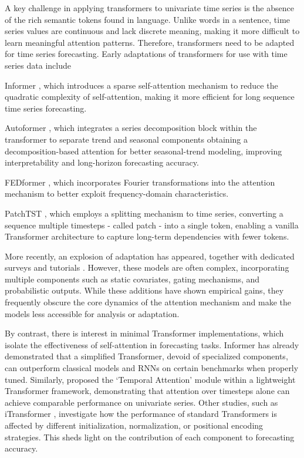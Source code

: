 \documentclass[algorithms,article,submit,pdftex,moreauthors]{Definitions/mdpi}
\begin{document}
A key challenge in applying transformers to univariate time series is the absence of the rich semantic tokens found in language. Unlike words in a sentence, time series values are continuous and lack discrete meaning, making it more difficult to learn meaningful attention patterns. Therefore, transformers need to be adapted for time series forecasting. Early adaptations of transformers for use with time series data include 

Informer \citep{ZZPZ21}, which introduces a sparse self-attention mechanism to reduce the quadratic complexity of self-attention, making it more efficient for long sequence time series forecasting.

Autoformer \citep{WXWL22}, which integrates a series decomposition block within the transformer to separate trend and seasonal components obtaining a decomposition-based attention for better seasonal-trend modeling, improving interpretability and long-horizon forecasting accuracy.

FEDformer \citep{ZMWW22}, which incorporates Fourier transformations into the attention mechanism to better exploit frequency-domain characteristics.

PatchTST \citep{patchTST}, which employs a splitting mechanism to time series, converting a sequence multiple timesteps - called patch - into a single token, enabling a vanilla Transformer architecture to capture long-term dependencies with fewer tokens. 

More recently, an explosion of adaptation has appeared, together with dedicated surveys and tutorials \cite{ WZZC23, ANTS23, SZLW25}. However, these models are often complex, incorporating multiple components such as static covariates, gating mechanisms, and probabilistic outputs. While these additions have shown empirical gains, they frequently obscure the core dynamics of the attention mechanism and make the models less accessible for analysis or adaptation.

By contrast, there is interest in minimal Transformer implementations, which isolate the effectiveness of self-attention in forecasting tasks. Informer has already demonstrated that a simplified Transformer, devoid of specialized components, can outperform classical models and RNNs on certain benchmarks when properly tuned. Similarly, \citep{LSNP21} proposed the `Temporal Attention' module within a lightweight Transformer framework, demonstrating that attention over timesteps alone can achieve comparable performance on univariate series. Other studies, such as iTransformer \cite{LHZW24}, investigate how the performance of standard Transformers is affected by different initialization, normalization, or positional encoding strategies. This sheds light on the contribution of each component to forecasting accuracy.
\end{document}

